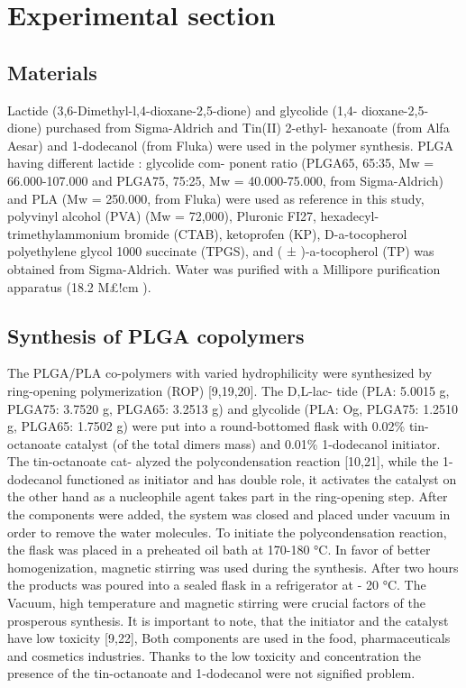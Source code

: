 \documentclass[11pt,letterpaper]{article}
\begin{document}
	
	\section{Experimental section}
	
	\subsection{Materials}
	
	Lactide (3,6-Dimethyl-l,4-dioxane-2,5-dione) and glycolide (1,4- dioxane-2,5-dione) purchased from Sigma-Aldrich and Tin(II) 2-ethyl- hexanoate (from Alfa Aesar) and 1-dodecanol (from Fluka) were used in
	the  polymer  synthesis. PLGA  having different lactide :  glycolide com-
	ponent   ratio  (PLGA65,  65:35,  Mw = 66.000-107.000  and  PLGA75,
	75:25,  Mw = 40.000-75.000,   from  Sigma-Aldrich)   and   PLA  (Mw = 250.000, from Fluka) were used as reference in this study, polyvinyl alcohol (PVA) (Mw = 72,000), Pluronic FI27, hexadecyl- trimethylammonium bromide (CTAB), ketoprofen (KP), D-a-tocopherol polyethylene glycol 1000 succinate (TPGS), and ( ± )-a-tocopherol (TP)  was  obtained  from  Sigma-Aldrich.  Water  was  purified  with  a
	Millipore purification apparatus (18.2 M£!cm ).
	
	\subsection{Synthesis of PLGA copolymers}
	
	The PLGA/PLA co-polymers with varied hydrophilicity were synthesized by ring-opening polymerization (ROP) [9,19,20]. The D,L-lac- tide (PLA: 5.0015 g, PLGA75: 3.7520 g, PLGA65: 3.2513 g) and glycolide (PLA: Og, PLGA75: 1.2510 g,  PLGA65: 1.7502 g)  were put  into a
	round-bottomed  flask  with  0.02\%  tin-octanoate  catalyst  (of  the total dimers mass) and 0.01\% 1-dodecanol initiator. The tin-octanoate cat- alyzed the polycondensation reaction [10,21], while the 1-dodecanol functioned as initiator and has double role, it activates the catalyst on the other hand as a nucleophile agent takes part in the ring-opening step.  After  the  components  were  added,  the system  was  closed and
	placed  under  vacuum  in  order  to  remove  the  water  molecules. To initiate the polycondensation reaction, the flask was placed in a preheated  oil  bath  at  170-180 °C.  In  favor  of  better  homogenization, magnetic stirring was used during the synthesis. After two hours the
	products was poured into a sealed flask in a refrigerator at - 20 °C. The Vacuum, high temperature and magnetic stirring were crucial factors of the prosperous synthesis.
	It is important to note, that the initiator and the catalyst have low
	toxicity [9,22], Both components are used in the food, pharmaceuticals and cosmetics industries. Thanks to the low toxicity and concentration the presence of the tin-octanoate and 1-dodecanol were not signified problem.
	
\end{document}
